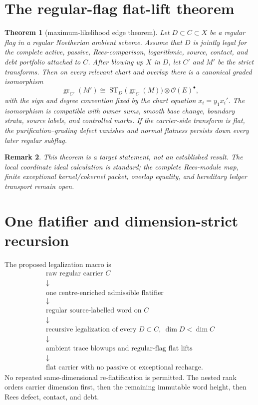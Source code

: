 \documentclass[11pt]{amsart}
\newtheorem{theorem}{Theorem}[section]
\newtheorem{remark}[theorem]{Remark}
\begin{document}
\section{The regular-flag flat-lift theorem}
\begin{theorem}[maximum-likelihood edge theorem]
Let $D\subset C\subset X$ be a regular flag in a regular Noetherian ambient
scheme.  Assume that $D$ is jointly legal for the complete active, passive,
Rees-comparison, logarithmic, source, contact, and debt portfolio attached to
$C$.  After blowing up $X$ in $D$, let $C'$ and $M'$ be the strict transforms.
Then on every relevant chart and overlap there is a canonical graded
isomorphism
\[
 \operatorname{gr}_{C'}(M')
 \cong
 \operatorname{ST}_D\bigl(\operatorname{gr}_C(M)\bigr)
 \otimes \mathcal O(E)^{\bullet},
\]
with the sign and degree convention fixed by the chart equation
$x_i=y_1x_i'$.  The isomorphism is compatible with owner sums, smooth base
change, boundary strata, source labels, and controlled marks.  If the
carrier-side transform is flat, the purification--grading defect vanishes and
normal flatness persists down every later regular subflag.
\end{theorem}

\begin{remark}
This theorem is a target statement, not an established result.  The local
coordinate ideal calculation is standard; the complete Rees-module map,
finite exceptional kernel/cokernel packet, overlap equality, and hereditary
ledger transport remain open.
\end{remark}

\section{One flatifier and dimension-strict recursion}
The proposed legalization macro is
\[
 \begin{array}{c}
 \text{raw regular carrier }C\\
 \downarrow\\
 \text{one centre-enriched admissible flatifier}\\
 \downarrow\\
 \text{regular source-labelled word on }C\\
 \downarrow\\
 \text{recursive legalization of every }D\subset C,\ \dim D<\dim C\\
 \downarrow\\
 \text{ambient trace blowups and regular-flag flat lifts}\\
 \downarrow\\
 \text{flat carrier with no passive or exceptional recharge.}
 \end{array}
\]
No repeated same-dimensional re-flatification is permitted.  The nested rank
orders carrier dimension first, then the remaining immutable word height, then
Rees defect, contact, and debt.
\end{document}
